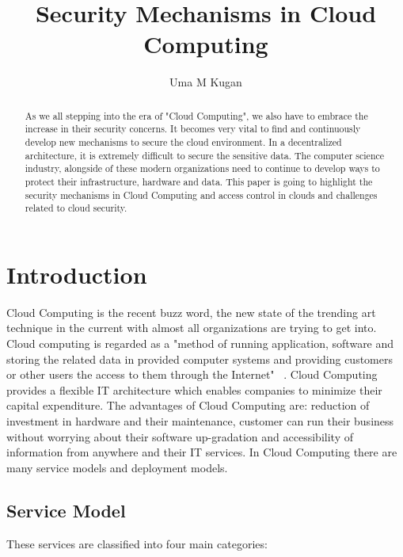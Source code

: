 \documentclass[sigconf]{acmart}
\begin{document}
\title{Security Mechanisms in Cloud Computing}

\author{Uma M Kugan}
\renewcommand{\shortauthors}{Uma Kugan}

\begin{abstract}
As we all stepping into the era of "Cloud Computing", we also have to embrace
the increase in their security concerns. It becomes very vital to find and 
continuously develop new mechanisms to secure the cloud environment. In a 
decentralized architecture, it is extremely difficult to secure the sensitive
data. The computer science industry, alongside of these modern  organizations
need to continue to develop ways to protect their infrastructure, hardware 
and data. This paper is going to highlight the security mechanisms in Cloud
Computing and access control in clouds and challenges related to cloud security.
\end{abstract}


\maketitle

\section{Introduction}
Cloud Computing is the recent buzz word, the new state of the trending 
art technique in the current with almost all organizations are trying
to get into. Cloud computing is regarded as a "method of running application, 
software and storing the related data in provided computer systems and 
providing customers or other users the access to them through the 
Internet" ~\cite{hid-sp18-513-cloud1}. Cloud Computing provides a flexible IT 
architecture which enables companies to minimize their capital expenditure. 
The advantages of Cloud Computing are: reduction of investment in hardware 
and their maintenance, customer can run their business without worrying 
about their software up-gradation and accessibility of information from 
anywhere and their IT services. In Cloud Computing there are many service 
models and deployment models. 

\subsection{Service Model} These services are classified into four main categories: 
\end{document}
